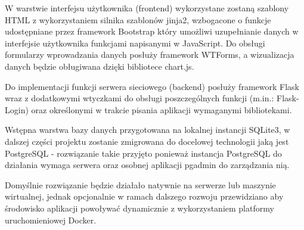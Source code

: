 \documentclass[a4paper,10pt, twoside]{report}
\newcommand{\customstylesection}[1]{\textbf{\textit{#1}}}
\begin{document}
\begin{large}
{W warstwie interfejsu użytkownika (frontend) wykorzystane zostaną szablony 
HTML z wykorzystaniem silnika szablonów jinja2\cite{jinja}, wzbogacone o funkcje
 udostępniane przez framework Bootstrap\cite{Bootstrap} który umożliwi 
uzupełnianie danych w interfejsie użytkownika funkcjami napisanymi w 
JavaScript\cite{Java}. Do obsługi formularzy wprowadzania danych posłuży 
framework WTForms\cite{WTForms}, a wizualizacja danych będzie obługiwana dzięki 
bibliotece chart.js\cite{chart.js}.}

{Do implementacji funkcji serwera sieciowego (backend) posłuży framework
 Flask\cite{Flask} wraz z dodatkowymi wtyczkami do obsługi poszczególnych 
funkcji (m.in.: Flask-Login\cite{Flask-Login}) oraz określonymi w trakcie 
pisania aplikacji wymaganymi bibliotekami.}

{Wstępna warstwa bazy danych przygotowana na lokalnej instancji 
SQLite3\cite{SQLite}, w dalszej części projektu zostanie zmigrowana do docelowej
 technologii jaką jest PostgreSQL\cite{PostgreSQL} - rozwiązanie takie przyjęto 
ponieważ instancja PostgreSQL do działania wymaga serwera oraz osobnej aplikacji
 pgadmin\cite{pgAdmin} do zarządzania nią.}

 {Domyślnie rozwiązanie będzie działało natywnie na serwerze lub maszynie 
 wirtualnej, jednak opcjonalnie w ramach dalszego rozwoju przewidziano aby 
 środowisko aplikacji powoływać dynamicznie z wykorzystaniem platformy 
 uruchomieniowej Docker\cite{Docker}.}






\end{large}
\end{document}
